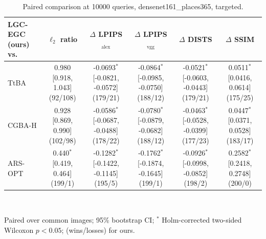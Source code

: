 \begin{table}[t]
\centering\footnotesize
\caption{Paired comparison at 10000 queries, densenet161\_places365, targeted.}
\begin{tabular}{lccccc}
\toprule
LGC-EGC (ours) vs. & $\ell_2$ ratio & $\Delta$ LPIPS$_{\mathrm{alex}}$ & $\Delta$ LPIPS$_{\mathrm{vgg}}$ & $\Delta$ DISTS & $\Delta$ SSIM \\
\midrule
TtBA & 0.980 [0.918, 1.043] (92/108) & -0.0693$^{*}$ [-0.0821, -0.0572] (179/21) & -0.0864$^{*}$ [-0.0985, -0.0750] (188/12) & -0.0521$^{*}$ [-0.0603, -0.0443] (179/21) & 0.0511$^{*}$ [0.0416, 0.0614] (175/25) \\
CGBA-H & 0.928 [0.869, 0.990] (102/98) & -0.0586$^{*}$ [-0.0687, -0.0488] (178/22) & -0.0780$^{*}$ [-0.0879, -0.0682] (188/12) & -0.0463$^{*}$ [-0.0528, -0.0399] (177/23) & 0.0447$^{*}$ [0.0371, 0.0528] (183/17) \\
ARS-OPT & 0.440$^{*}$ [0.419, 0.464] (199/1) & -0.1282$^{*}$ [-0.1422, -0.1145] (195/5) & -0.1762$^{*}$ [-0.1874, -0.1645] (199/1) & -0.0926$^{*}$ [-0.0998, -0.0852] (198/2) & 0.2582$^{*}$ [0.2418, 0.2748] (200/0) \\
\bottomrule
\end{tabular}
\\[2pt]\parbox{\linewidth}{\scriptsize Paired over common images; 95\% bootstrap CI; $^{*}$ Holm-corrected two-sided Wilcoxon $p<0.05$; (wins/losses) for ours.}
\end{table}
